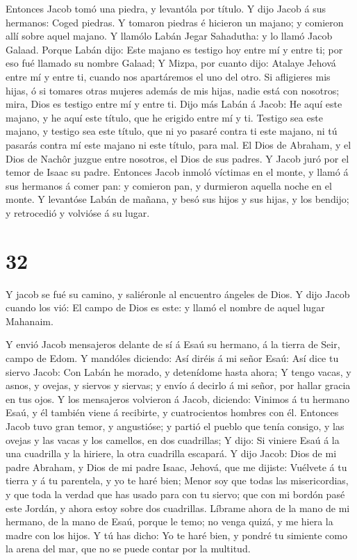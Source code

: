  Entonces Jacob tomó una piedra, y levantóla por título.
 Y dijo Jacob á sus hermanos: Coged piedras. Y tomaron
piedras é hicieron un majano; y comieron allí sobre aquel majano.
 Y llamólo Labán Jegar Sahadutha: y lo llamó Jacob Galaad.
 Porque Labán dijo: Este majano es testigo hoy entre mí y
entre ti; por eso fué llamado su nombre Galaad;  Y Mizpa,
por cuanto dijo: Atalaye Jehová entre mí y entre ti, cuando nos
apartáremos el uno del otro.  Si afligieres mis hijas, ó si
tomares otras mujeres además de mis hijas, nadie está con nosotros;
mira, Dios es testigo entre mí y entre ti.  Dijo más Labán
á Jacob: He aquí este majano, y he aquí este título, que he erigido
entre mí y ti.  Testigo sea este majano, y testigo sea este
título, que ni yo pasaré contra ti este majano, ni tú pasarás contra mí
este majano ni este título, para mal.  El Dios de Abraham,
y el Dios de Nachôr juzgue entre nosotros, el Dios de sus padres. Y
Jacob juró por el temor de Isaac su padre.  Entonces Jacob
inmoló víctimas en el monte, y llamó á sus hermanos á comer pan: y
comieron pan, y durmieron aquella noche en el monte.  Y
levantóse Labán de mañana, y besó sus hijos y sus hijas, y los bendijo;
y retrocedió y volvióse á su lugar.

\hypertarget{section-31}{%
\section{32}\label{section-31}}

 Y jacob se fué su camino, y saliéronle al encuentro ángeles
de Dios.  Y dijo Jacob cuando los vió: El campo de Dios es
este: y llamó el nombre de aquel lugar Mahanaim.

 Y envió Jacob mensajeros delante de sí á Esaú su hermano, á
la tierra de Seir, campo de Edom.  Y mandóles diciendo: Así
diréis á mi señor Esaú: Así dice tu siervo Jacob: Con Labán he morado, y
detenídome hasta ahora;  Y tengo vacas, y asnos, y ovejas, y
siervos y siervas; y envío á decirlo á mi señor, por hallar gracia en
tus ojos.  Y los mensajeros volvieron á Jacob, diciendo:
Vinimos á tu hermano Esaú, y él también viene á recibirte, y
cuatrocientos hombres con él.  Entonces Jacob tuvo gran
temor, y angustióse; y partió el pueblo que tenía consigo, y las ovejas
y las vacas y los camellos, en dos cuadrillas;  Y dijo: Si
viniere Esaú á la una cuadrilla y la hiriere, la otra cuadrilla
escapará.  Y dijo Jacob: Dios de mi padre Abraham, y Dios de
mi padre Isaac, Jehová, que me dijiste: Vuélvete á tu tierra y á tu
parentela, y yo te haré bien;  Menor soy que todas las
misericordias, y que toda la verdad que has usado para con tu siervo;
que con mi bordón pasé este Jordán, y ahora estoy sobre dos cuadrillas.
 Líbrame ahora de la mano de mi hermano, de la mano de
Esaú, porque le temo; no venga quizá, y me hiera la madre con los hijos.
 Y tú has dicho: Yo te haré bien, y pondré tu simiente como
la arena del mar, que no se puede contar por la multitud.

